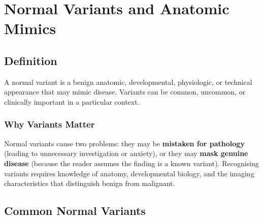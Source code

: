 \chapter{Normal Variants and Anatomic Mimics}

\label{ch:ch31_normal_variants}

\section{Definition}
A normal variant is a benign anatomic, developmental, physiologic, or technical appearance that may mimic disease. Variants can be common, uncommon, or clinically important in a particular context.

\subsection{Why Variants Matter}
Normal variants cause two problems: they may be \textbf{mistaken for pathology} (leading to unnecessary investigation or anxiety), or they may \textbf{mask genuine disease} (because the reader assumes the finding is a known variant). Recognising variants requires knowledge of anatomy, developmental biology, and the imaging characteristics that distinguish benign from malignant.

\section{Common Normal Variants}

